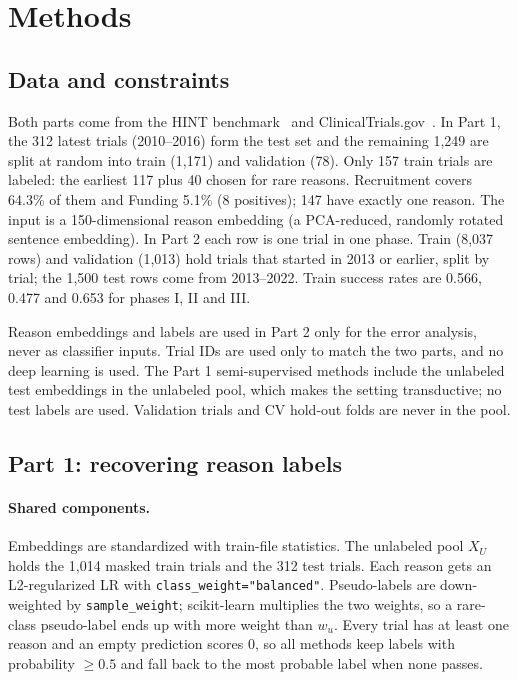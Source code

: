 \section{Methods}
\label{sec:methods}

\subsection{Data and constraints}

Both parts come from the HINT benchmark~\cite{fu2022hint} and ClinicalTrials.gov~\cite{ctgov}.
In Part 1, the 312 latest trials (2010--2016) form the test set and the remaining 1,249 are split at random into train (1,171) and validation (78).
Only 157 train trials are labeled: the earliest 117 plus 40 chosen for rare reasons.
Recruitment covers 64.3\% of them and Funding 5.1\% (8 positives); 147 have exactly one reason.
The input is a 150-dimensional reason embedding (a PCA-reduced, randomly rotated sentence embedding).
In Part 2 each row is one trial in one phase.
Train (8,037 rows) and validation (1,013) hold trials that started in 2013 or earlier, split by trial; the 1,500 test rows come from 2013--2022.
Train success rates are 0.566, 0.477 and 0.653 for phases I, II and III.

Reason embeddings and labels are used in Part 2 only for the error analysis, never as classifier inputs.
Trial IDs are used only to match the two parts, and no deep learning is used.
The Part 1 semi-supervised methods include the unlabeled test embeddings in the unlabeled pool, which makes the setting transductive; no test labels are used.
Validation trials and CV hold-out folds are never in the pool.

\subsection{Part 1: recovering reason labels}

\paragraph{Shared components.}
Embeddings are standardized with train-file statistics.
The unlabeled pool $X_U$ holds the 1,014 masked train trials and the 312 test trials.
Each reason gets an L2-regularized LR with \texttt{class\_weight="balanced"}.
Pseudo-labels are down-weighted by \texttt{sample\_weight}; scikit-learn multiplies the two weights, so a rare-class pseudo-label ends up with more weight than $w_u$.
Every trial has at least one reason and an empty prediction scores 0, so all methods keep labels with probability $\ge 0.5$ and fall back to the most probable label when none passes.

